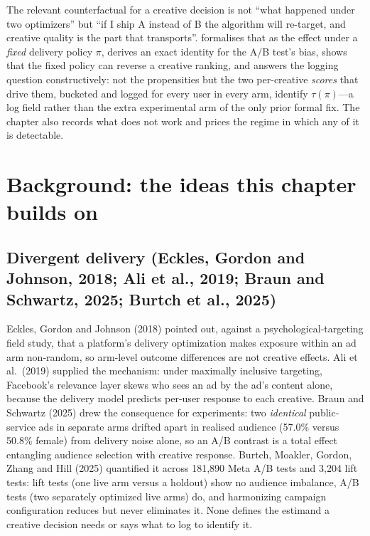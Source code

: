 The relevant counterfactual for a creative decision is not ``what happened under two optimizers'' but ``if I ship A instead of B the algorithm will re-target, and creative quality is the part that transports''.  formalises that as the effect under a \emph{fixed} delivery policy $\pi$, derives an exact identity for the A/B test's bias, shows that the fixed policy can reverse a creative ranking, and answers the logging question constructively: not the propensities but the two per-creative \emph{scores} that drive them, bucketed and logged for every user in every arm, identify $\tau(\pi)$---a log field rather than the extra experimental arm of the only prior formal fix. The chapter also records what does not work and prices the regime in which any of it is detectable.

\section{Background: the ideas this chapter builds on}

\subsection{Divergent delivery (Eckles, Gordon and Johnson, 2018; Ali et al., 2019; Braun and Schwartz, 2025; Burtch et al., 2025)}

Eckles, Gordon and Johnson (2018) pointed out, against a psychological-targeting field study, that a platform's delivery optimization makes exposure within an ad arm non-random, so arm-level outcome differences are not creative effects. Ali et al.\ (2019) supplied the mechanism: under maximally inclusive targeting, Facebook's relevance layer skews who sees an ad by the ad's content alone, because the delivery model predicts per-user response to each creative. Braun and Schwartz (2025) drew the consequence for experiments: two \emph{identical} public-service ads in separate arms drifted apart in realised audience (57.0\% versus 50.8\% female) from delivery noise alone, so an A/B contrast is a total effect entangling audience selection with creative response. Burtch, Moakler, Gordon, Zhang and Hill (2025) quantified it across 181{,}890 Meta A/B tests and 3{,}204 lift tests: lift tests (one live arm versus a holdout) show no audience imbalance, A/B tests (two separately optimized live arms) do, and harmonizing campaign configuration reduces but never eliminates it. None defines the estimand a creative decision needs or says what to log to identify it.

